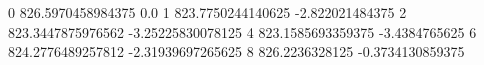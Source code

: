 0 826.5970458984375 0.0
1 823.7750244140625 -2.822021484375
2 823.3447875976562 -3.25225830078125
4 823.1585693359375 -3.4384765625
6 824.2776489257812 -2.31939697265625
8 826.2236328125 -0.3734130859375
